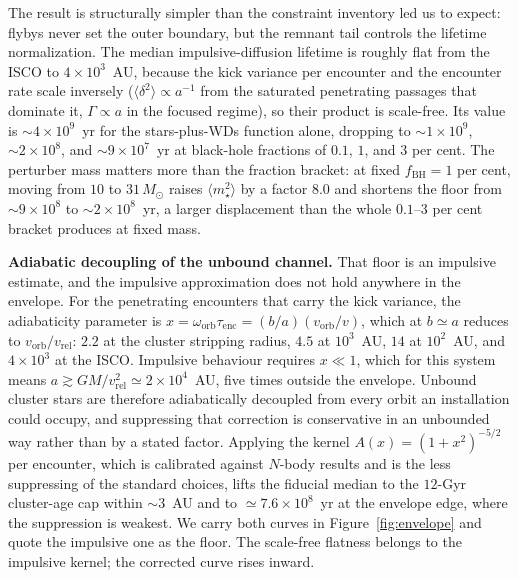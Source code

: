\documentclass[11pt]{article}
\newcommand{\msun}{\ensuremath{M_\odot}}
\begin{document}
The result is structurally simpler than the constraint inventory led us to expect: flybys never set the outer boundary, but the remnant tail controls the lifetime normalization. The median impulsive-diffusion lifetime is roughly flat from the ISCO to $4\times10^{3}$~AU, because the kick variance per encounter and the encounter rate scale inversely ($\langle\delta^{2}\rangle \propto a^{-1}$ from the saturated penetrating passages that dominate it, $\Gamma \propto a$ in the focused regime), so their product is scale-free. Its value is $\sim 4\times10^{9}$~yr for the stars-plus-WDs function alone, dropping to $\sim 1\times10^{9}$, $\sim 2\times10^{8}$, and $\sim 9\times10^{7}$~yr at black-hole fractions of $0.1$, $1$, and $3$ per cent. The perturber mass matters more than the fraction bracket: at fixed $f_{\mathrm{BH}} = 1$ per cent, moving from $10$ to $31\,\msun$ raises $\langle m_{\star}^{2}\rangle$ by a factor $8.0$ and shortens the floor from $\sim 9\times10^{8}$ to $\sim 2\times10^{8}$~yr, a larger displacement than the whole $0.1$--$3$ per cent bracket produces at fixed mass.

\textbf{Adiabatic decoupling of the unbound channel.} That floor is an impulsive estimate, and the impulsive approximation does not hold anywhere in the envelope. For the penetrating encounters that carry the kick variance, the adiabaticity parameter is $x = \omega_{\mathrm{orb}}\tau_{\mathrm{enc}} = (b/a)(v_{\mathrm{orb}}/v)$, which at $b \simeq a$ reduces to $v_{\mathrm{orb}}/v_{\mathrm{rel}}$: $2.2$ at the cluster stripping radius, $4.5$ at $10^{3}$~AU, $14$ at $10^{2}$~AU, and $4\times10^{3}$ at the ISCO. Impulsive behaviour requires $x \ll 1$, which for this system means $a \gtrsim GM/v_{\mathrm{rel}}^{2} \simeq 2\times10^{4}$~AU, five times outside the envelope. Unbound cluster stars are therefore adiabatically decoupled from every orbit an installation could occupy, and suppressing that correction is conservative in an unbounded way rather than by a stated factor. Applying the \citet{GnedinOstriker1999} kernel $A(x) = (1+x^{2})^{-5/2}$ per encounter, which is calibrated against $N$-body results and is the less suppressing of the standard choices, lifts the fiducial median to the $12$-Gyr cluster-age cap within $\sim 3$~AU and to $\simeq 7.6\times10^{8}$~yr at the envelope edge, where the suppression is weakest. We carry both curves in Figure~\ref{fig:envelope} and quote the impulsive one as the floor. The scale-free flatness belongs to the impulsive kernel; the corrected curve rises inward.
\end{document}
